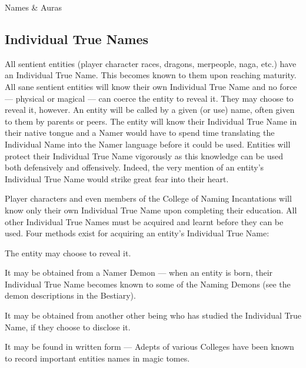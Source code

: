 \begin{Chapter}{Names \& Auras}
\begin{Itemize}
\end{Itemize}

\subsection{Individual True Names}

All sentient entities (player character races, dragons, merpeople,
naga, etc.) have an Individual True Name. This becomes known to them
upon reaching maturity.  All sane sentient entities will know their
own Individual True Name and no force — physical or magical — can
coerce the entity to reveal it.  They may choose to reveal it,
however.  An entity will be called by a given (or use) name, often
given to them by parents or peers.  The entity will know their
Individual True Name in their native tongue and a Namer would have to
spend time translating the Individual Name into the Namer language
before it could be used.  Entities will protect their Individual True
Name vigorously as this knowledge can be used both defensively and
offensively.  Indeed, the very mention of an entity’s Individual True
Name would strike great fear into their heart.

Player characters and even members of the College of Naming
Incantations will know only their own Individual True Name upon
completing their education.  All other Individual True Names must be
acquired and learnt before they can be used.  Four methods exist for
acquiring an entity’s Individual True Name:

\begin{Itemize}

\item The entity may choose to reveal it.  

\item It may be obtained from a Namer Demon — when an entity is born,
  their Individual True Name becomes known to some of the Naming
  Demons (see the demon descriptions in the Bestiary).

\item It may be obtained from another other being who has studied the
  Individual True Name, if they choose to disclose it.

\item It may be found in written form — Adepts of various Colleges
  have been known to record important entities names in magic tomes.

\end{Itemize}


\end{Chapter}
